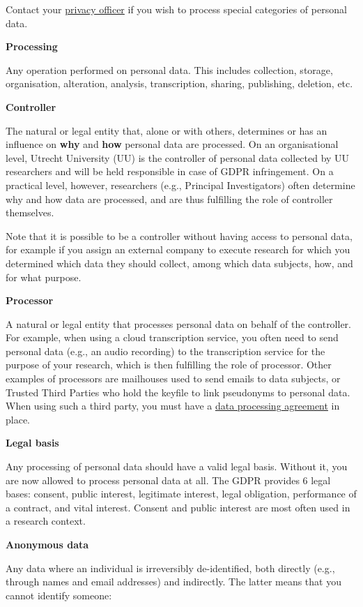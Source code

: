 \documentclass[
]{book}
\begin{document}
Contact your \protect\hyperlink{support}{privacy officer} if you wish to process special categories of personal data.

\textbf{Processing}

Any operation performed on personal data. This includes collection, storage, organisation, alteration, analysis, transcription, sharing, publishing, deletion, etc.

\textbf{Controller}

The natural or legal entity that, alone or with others, determines or has an influence on \textbf{why} and \textbf{how} personal data are processed. On an organisational level, Utrecht University (UU) is the controller of personal data collected by UU researchers and will be held responsible in case of GDPR
infringement. On a practical level, however, researchers (e.g., Principal Investigators) often determine why and how data are processed, and are thus fulfilling the role of controller themselves.

Note that it is possible to be a controller without having access to personal data, for example if you assign an external company to execute research for which you determined which data they should collect, among which data subjects, how, and for what purpose.

\textbf{Processor}

A natural or legal entity that processes personal data on behalf of the controller. For example, when using a cloud transcription service, you often need to send personal data (e.g., an audio recording) to the transcription service for the purpose of your research, which is then fulfilling the role of processor. Other examples of processors are mailhouses used to send emails to data subjects, or Trusted Third Parties who hold the keyfile to link pseudonyms to personal data. When using such a third party, you must have a \protect\hyperlink{data-processing-agreement}{data processing agreement} in place.

\textbf{Legal basis}

Any processing of personal data should have a valid legal basis. Without it, you are now allowed to process personal data at all. The GDPR provides 6 legal bases: consent, public interest, legitimate interest, legal obligation, performance of a contract, and vital interest. Consent and public interest are most often used in a research context.

\textbf{Anonymous data}

Any data where an individual is irreversibly de-identified, both directly (e.g., through names and email addresses) and indirectly. The latter means that you cannot identify someone:
\end{document}
